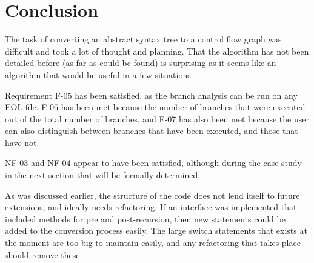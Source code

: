\section{Conclusion}

The task of converting an abstract syntax tree to a control flow graph was difficult and took a lot of thought and planning. That the algorithm has not been detailed before (as far as could be found) is surprising as it seems like an algorithm that would be useful in a few situations.

Requirement F-05 has been satisfied, as the branch analysis can be run on any EOL file. F-06 has been met because the number of branches that were executed out of the total number of branches, and F-07 has also been met because the user can also distinguish between branches that have been executed, and those that have not.

NF-03 and NF-04 appear to have been satisfied, although during the case study in the next section that will be formally determined.

As was discussed earlier, the structure of the code does not lend itself to future extensions, and ideally needs refactoring. If an interface was implemented that included methods for pre and post-recursion, then new statements could be added to the conversion process easily. The large switch statements that exists at the moment are too big to maintain easily, and any refactoring that takes place should remove these.
